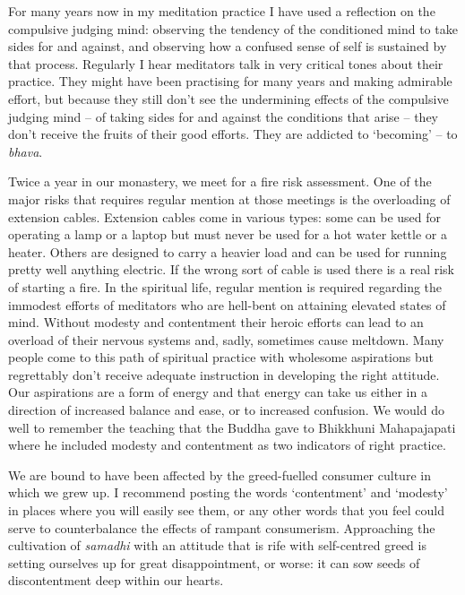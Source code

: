 For many years now in my meditation practice I have used a reflection on
the compulsive judging mind: observing the tendency of the conditioned
mind to take sides for and against, and observing how a confused sense
of self is sustained by that process. Regularly I hear meditators talk
in very critical tones about their practice. They might have been
practising for many years and making admirable effort, but because they
still don't see the undermining effects of the compulsive judging mind
-- of taking sides for and against the conditions that arise -- they
don't receive the fruits of their good efforts. They are addicted to
`becoming' -- to \emph{bhava}.

Twice a year in our monastery, we meet for a fire risk assessment. One
of the major risks that requires regular mention at those meetings is
the overloading of extension cables. Extension cables come in various
types: some can be used for operating a lamp or a laptop but must never
be used for a hot water kettle or a heater. Others are designed to carry
a heavier load and can be used for running pretty well anything
electric. If the wrong sort of cable is used there is a real risk of
starting a fire. In the spiritual life, regular mention is required
regarding the immodest efforts of meditators who are hell-bent on
attaining elevated states of mind. Without modesty and contentment their
heroic efforts can lead to an overload of their nervous systems and,
sadly, sometimes cause meltdown. Many people come to this path of
spiritual practice with wholesome aspirations but regrettably don't
receive adequate instruction in developing the right attitude. Our
aspirations are a form of energy and that energy can take us either in a
direction of increased balance and ease, or to increased confusion. We
would do well to remember the teaching that the Buddha gave to Bhikkhuni
Mahapajapati where he included modesty and contentment as two indicators
of right practice.

We are bound to have been affected by the greed-fuelled consumer culture
in which we grew up. I recommend posting the words `contentment' and
`modesty' in places where you will easily see them, or any other words
that you feel could serve to counterbalance the effects of rampant
consumerism. Approaching the cultivation of \emph{samadhi} with an
attitude that is rife with self-centred greed is setting ourselves up
for great disappointment, or worse: it can sow seeds of discontentment
deep within our hearts.

